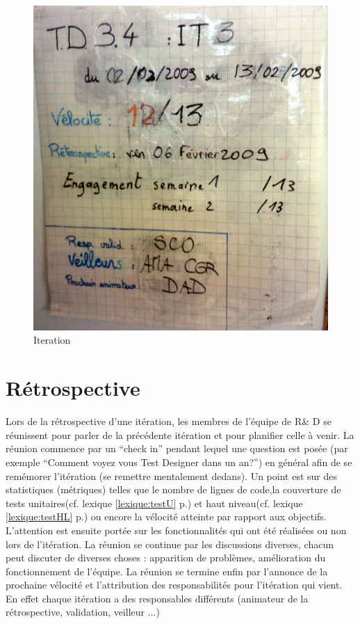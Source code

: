 \begin{figure}[!h]
\centering
\includegraphics[scale=0.10]{Illustrations/SP_A0182.jpg}
\caption{Iteration}
\label{fig:Iteration}
\end{figure}

\section{Rétrospective}
Lors de la rétrospective d'une itération, les membres de l'équipe de R\& D se réunissent pour parler de la précédente itération et pour planifier celle à venir. La réunion commence par un ``check in'' pendant lequel une question est posée (par exemple ``Comment voyez vous Test Designer dans un an?'') en général afin de se remémorer l'itération (se remettre mentalement dedans). Un point est sur des statistiques (métriques) telles que le nombre de lignes de code,la couverture de tests unitaires(cf. lexique \ref{lexique:testU} p.\pageref{lexique:testU}) et haut niveau(cf. lexique \ref{lexique:testHL} p.\pageref{lexique:testHL}) ou encore la vélocité atteinte par rapport aux objectifs. L'attention est ensuite portée sur les fonctionnalités qui ont été réalisées ou non lors de l'itération. La réunion se continue par les discussions diverses, chacun peut discuter de diverses choses : apparition de problèmes, amélioration du fonctionnement de l'équipe. La réunion se termine enfin par l'annonce de la prochaine vélocité et l'attribution des responsabilités pour l'itération qui vient. En effet chaque itération a des responsables différents (animateur de la rétrospective, validation, veilleur ...)

